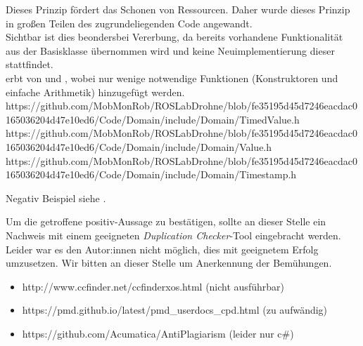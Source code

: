 Dieses Prinzip fördert das Schonen von Ressourcen. Daher wurde dieses Prinzip in großen Teilen des zugrundeliegenden Code angewandt.\\
Sichtbar ist dies beondersbei Vererbung, da bereits vorhandene Funktionalität aus der Basisklasse übernommen wird und keine Neuimplementierung dieser stattfindet.
\zB\\
 erbt von  und , wobei nur wenige notwendige Funktionen (Konstruktoren und einfache Arithmetik) hinzugefügt werden.
https://github.com/MobMonRob/ROSLabDrohne/blob/fe35195d45d7246eacdac0165036204d47e10ed6/Code/Domain/include/Domain/TimedValue.h
https://github.com/MobMonRob/ROSLabDrohne/blob/fe35195d45d7246eacdac0165036204d47e10ed6/Code/Domain/include/Domain/Value.h
https://github.com/MobMonRob/ROSLabDrohne/blob/fe35195d45d7246eacdac0165036204d47e10ed6/Code/Domain/include/Domain/Timestamp.h


Negativ Beispiel siehe .


Um die getroffene positiv-Aussage zu bestätigen, sollte an dieser Stelle ein Nachweis mit einem geeigneten \textit{Duplication Checker}-Tool eingebracht werden.
Leider war es den Autor:innen nicht möglich, dies mit geeignetem Erfolg umzusetzen. Wir bitten an dieser Stelle um Anerkennung der Bemühungen.

\begin{itemize}
\item http://www.ccfinder.net/ccfinderxos.html (nicht ausführbar)
\item https://pmd.github.io/latest/pmd\_userdocs\_cpd.html (zu aufwändig)
\item https://github.com/Acumatica/AntiPlagiarism (leider nur c\#)
\end{itemize}

